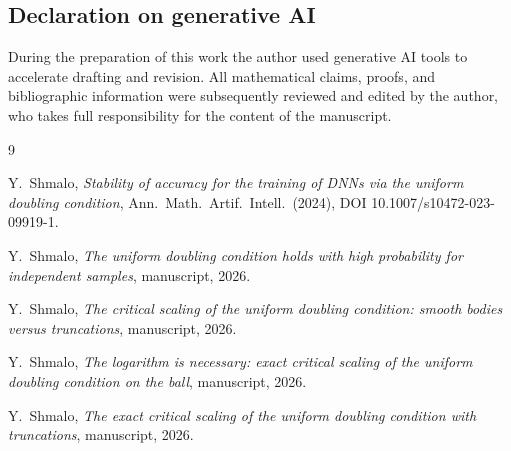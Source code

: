 \documentclass[11pt]{article}
\begin{document}
\subsection*{Declaration on generative AI}
During the preparation of this work the author used generative AI tools to
accelerate drafting and revision.  All mathematical claims, proofs, and
bibliographic information were subsequently reviewed and edited by the author,
who takes full responsibility for the content of the manuscript.

\begin{thebibliography}{9}

Y.~Shmalo,
\emph{Stability of accuracy for the training of DNNs via the uniform doubling
condition},
Ann.\ Math.\ Artif.\ Intell.\ (2024), DOI 10.1007/s10472-023-09919-1.

Y.~Shmalo,
\emph{The uniform doubling condition holds with high probability for
independent samples}, manuscript, 2026.

Y.~Shmalo,
\emph{The critical scaling of the uniform doubling condition: smooth bodies
versus truncations}, manuscript, 2026.

Y.~Shmalo,
\emph{The logarithm is necessary: exact critical scaling of the uniform
doubling condition on the ball}, manuscript, 2026.

Y.~Shmalo,
\emph{The exact critical scaling of the uniform doubling condition with
truncations}, manuscript, 2026.

\end{thebibliography}
\end{document}
